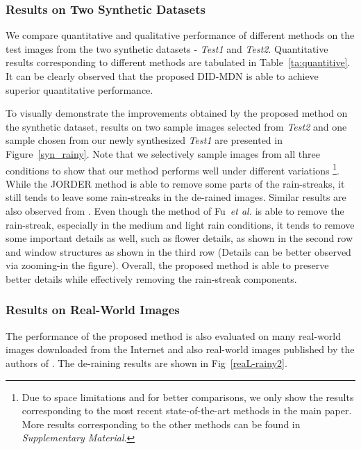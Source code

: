 \documentclass[10pt,twocolumn,letterpaper]{article}
\begin{document}
\subsubsection{Results on Two Synthetic Datasets}
We compare quantitative and qualitative performance of different methods on the test images from the two synthetic datasets - \emph{Test1} and \emph{Test2}. Quantitative results corresponding to different methods are tabulated in Table~\ref{ta:quantitive}. It can be clearly observed that the proposed DID-MDN is able to achieve superior quantitative performance.  

To visually demonstrate the improvements obtained by the proposed method on the synthetic dataset, results on two sample images selected from \emph{Test2} and one sample chosen from our newly synthesized \emph{Test1} are presented in Figure~\ref{syn_rainy}. Note that we selectively sample  images from all three conditions to show that our method performs well under different variations \footnote{Due to space limitations and for better comparisons, we only show the results corresponding to the most recent state-of-the-art methods \cite{derain_cvpr2017_multi,derain_cvpr2017,derain_iccv17} in the main paper.  More results corresponding to the other methods \cite{dis_rain_2015,rain_2016_gmm,derain_tip17} can be found in  \emph{Supplementary Material}.}. While the JORDER method \cite{derain_cvpr2017_multi} is able to remove some parts of the rain-streaks, it still tends  to leave some rain-streaks in the de-rained images. Similar results are also observed from \cite{derain_iccv17}. Even though the method of Fu~\emph{et al.} \cite{derain_cvpr2017} is able to remove the rain-streak, especially in the medium and light rain conditions, it tends to remove some important details as well, such as  flower details, as shown in the second row and window structures as shown in the third row (Details can be better observed via zooming-in the figure). Overall, the proposed method is able to preserve better details while effectively removing the rain-streak components. 

\subsubsection{Results on Real-World Images}
The  performance  of  the
proposed  method is also evaluated on  many  real-world images downloaded from the Internet and also real-world images published by the authors of \cite{derain_2017_zhang,derain_cvpr2017}.  The de-raining results are shown in Fig~\ref{reaL-rainy2}. 
\end{document}
